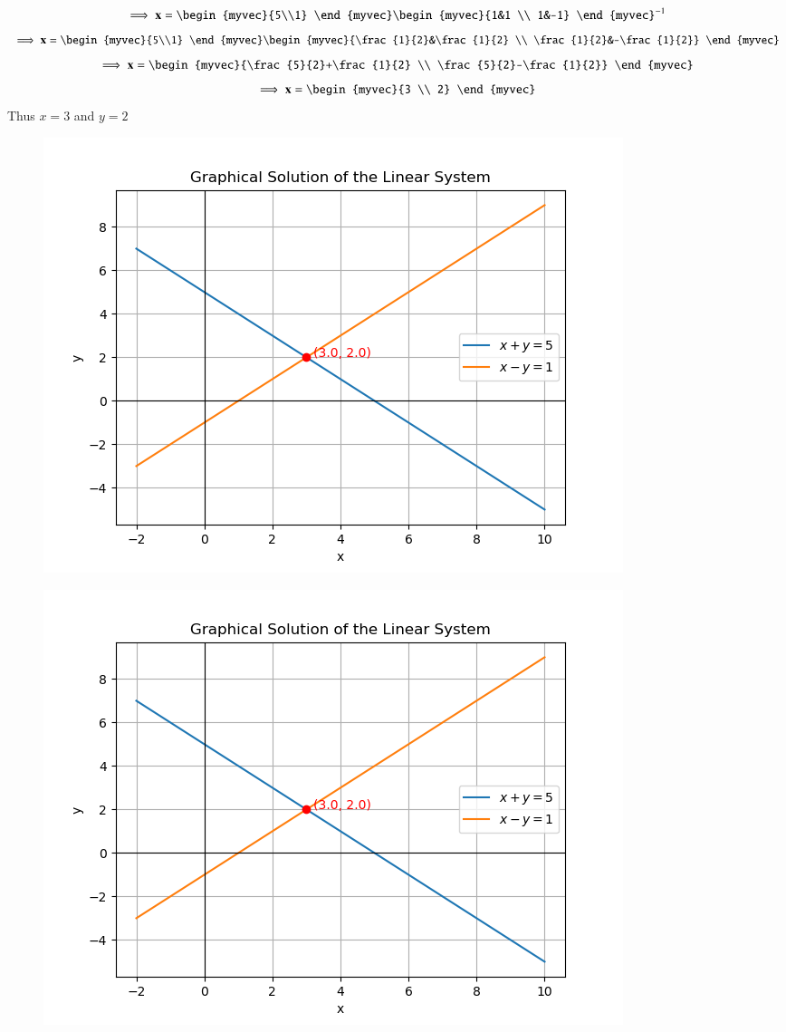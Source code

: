 \documentclass[journal]{IEEEtran}
\begin{document}
	\begin{align}
		\implies \vec{x} = 	\begin{myvec}{5\\1} \end{myvec}\begin{myvec}{1&1 \\ 1&-1} \end{myvec}^{-1}
	\end{align}
	\begin{align}
		\implies \vec{x} = 	\begin{myvec}{5\\1} \end{myvec}\begin{myvec}{\frac{1}{2}&\frac{1}{2} \\ \frac{1}{2}&-\frac{1}{2}} \end{myvec}
	\end{align}
	\begin{align}
		\implies \vec{x} = 	\begin{myvec}{\frac{5}{2}+\frac{1}{2} \\ \frac{5}{2}-\frac{1}{2}} \end{myvec}
	\end{align}
	\begin{align}
		\implies \vec{x} = 	\begin{myvec}{3 \\ 2} \end{myvec}
	\end{align}
	Thus $x=3$ and $y=2$
	
	\begin{figure}[H]
		\centering
		\includegraphics[width = 0.8\columnwidth]{figs/Figure_1.png}
		\caption*{}
		\label{fig1}
	\end{figure}
	\begin{figure}[H]
		\centering
		\includegraphics[width = 0.8\columnwidth]{figs/Figure_2.png}
		\caption*{}
		\label{fig2}
	\end{figure}
	
	
\end{document}
